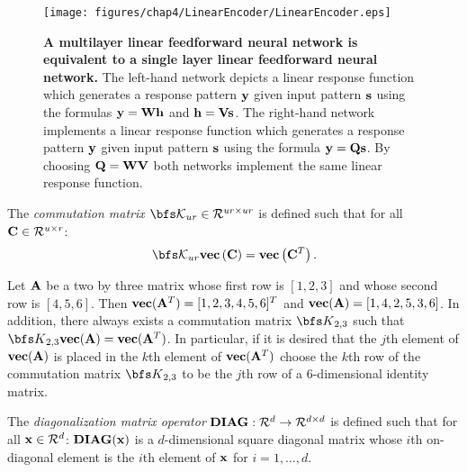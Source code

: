 \begin{figure}[tbp] %
  \centering
  \texttt{[image: figures/chap4/LinearEncoder/LinearEncoder.eps]}
  \caption{{\bf A multilayer linear feedforward neural network is equivalent to a single layer linear feedforward neural network.}
The left-hand network depicts a linear 
response function which generates a response pattern ${\bf y}$ given input pattern
${\bf s}$ using the formulas ${\bf y} = {\bf W}{\bf h}$ and ${\bf h} = {\bf V}{\bf s}$.
The right-hand network implements a linear response function which generates a response
pattern ${\bf y}$ given input pattern ${\bf s}$ using the formula ${\bf y} = {\bf Q}{\bf s}$.
By choosing ${\bf Q} = {\bf W}{\bf V}$ both networks implement the same linear response function.}
  \label{fig:Ch4:MultiLayerLinearNet}
\end{figure}






 



\begin{definition}
The {\em commutation matrix}  ${\cal {\bfs K}}_{ur} \in {\cal R}^{ur \times ur}$ is defined such that for all
${\bf C} \in {\cal R}^{u \times r}$:
\begin{displaymath}
{\cal {\bfs K}}_{ur}{\bf vec} \left( {\bf C} \right) = {\bf vec} \left( {\bf C}^T  \right).
\end{displaymath} 
\end{definition}

Let ${\bf A}$ be a two by three matrix whose first row is $[1, 2, 3]$ and
whose second row is $[4, 5, 6]$. Then ${\bf vec}({\bf A}^T) = [1, 2, 3, 4, 5, 6]^T$
and ${\bf vec}({\bf A}) = [1, 4, 2, 5, 3, 6]$. In addition, there always exists a 
commutation matrix ${\bfs K}_{2,3}$ such that ${\bfs K}_{2,3} {\bf vec}({\bf A}) = {\bf vec}({\bf A}^T)$.
In particular, if it is desired that the $j$th element of ${\bf vec}({\bf A})$ is placed in the
$k$th element of ${\bf vec}({\bf A}^T)$ choose the $k$th row of the commutation
matrix ${\bfs K}_{2,3}$ to be the $j$th row of a $6$-dimensional identity matrix.

\begin{definition}
The {\em diagonalization matrix operator} ${\bf DIAG} : {\cal R}^d \rightarrow {\cal R}^{d \times d}$
is defined such that for all ${\bf x} \in {\cal R}^d$:
${\bf DIAG}({\bf x})$ is a $d$-dimensional square diagonal matrix whose $i$th on-diagonal element is
the $i$th element of ${\bf x}$ for $i = 1, \ldots, d$.
\end{definition}

